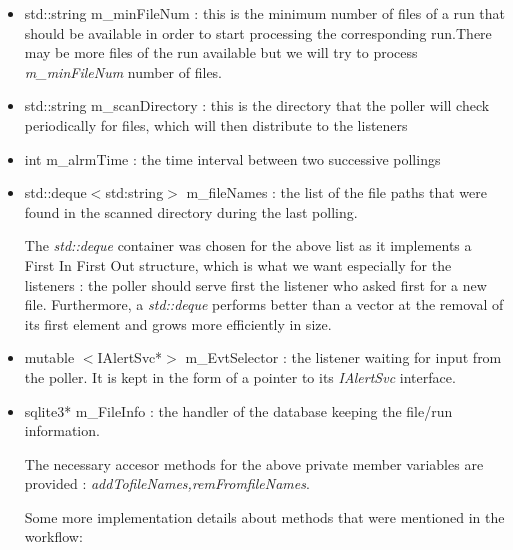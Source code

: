 \begin{itemize}

\item std::string m\_minFileNum : this is the minimum number of files of a run that should be available in order to start processing the corresponding run.There may be more files of the run available but we will try to process \textit{m\_minFileNum} number of files.\par 
\item std::string m\_scanDirectory : this is the directory that the poller will check periodically for files, which will then distribute to the listeners\par
\item int m\_alrmTime : the time interval between two successive pollings\par
\item std::deque$<$std:string$>$ m\_fileNames : the list of the file paths that were found in the scanned directory during the last polling.\par 
\bigskip\noindent
The \textit{std::deque} container was chosen for the above list as it implements a First In First Out structure, which is what we want especially for the listeners : the poller should serve first the listener who asked first for a new file. Furthermore, a  \textit{std::deque} performs better than a vector at the removal of its first element and grows more efficiently in size.\par
\bigskip\noindent
\item mutable $<$IAlertSvc*$>$ m\_EvtSelector : the listener waiting for input from the poller. It is kept in the form of a pointer to its \textit{IAlertSvc} interface.\par
\item sqlite3* m\_FileInfo : the handler of the database keeping the file/run information.\par
\bigskip\noindent
The necessary accesor methods for the above private member variables are provided : \textit{addTofileNames,remFromfileNames}.\par
Some more implementation details about methods that were mentioned in the workflow:\par


\end{itemize}
